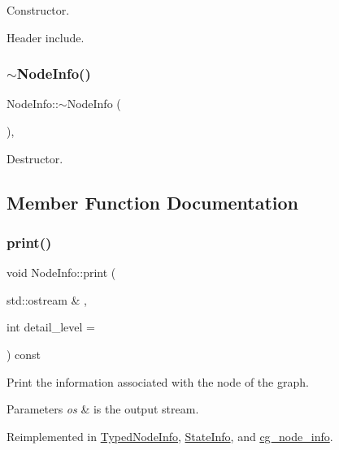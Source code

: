Constructor. 

Header include. \mbox{\label{structNodeInfo_a1543255862f1a3dbc456d1113c0c8f49}} 
\subsubsection{\texorpdfstring{$\sim$\+Node\+Info()}{~NodeInfo()}}
{\footnotesize\ttfamily Node\+Info\+::$\sim$\+Node\+Info (\begin{DoxyParamCaption}{ }\end{DoxyParamCaption})\hspace{0.3cm}{\ttfamily [virtual]}, {\ttfamily [default]}}



Destructor. 



\subsection{Member Function Documentation}
\mbox{\label{structNodeInfo_adacfeaff90018a35bde5211edbbd1114}} 
\subsubsection{\texorpdfstring{print()}{print()}}
{\footnotesize\ttfamily void Node\+Info\+::print (\begin{DoxyParamCaption}\item[{std\+::ostream \&}]{,  }\item[{int}]{detail\+\_\+level = {} }\end{DoxyParamCaption}) const\hspace{0.3cm}{\ttfamily [virtual]}}



Print the information associated with the node of the graph. 


\begin{DoxyParams}{Parameters}
{\em os} & is the output stream. \\
\hline
\end{DoxyParams}


Reimplemented in \hyperlink{structTypedNodeInfo_ad2e8b00442b9215ece3d7b2cf2495aef}{Typed\+Node\+Info}, \hyperlink{structStateInfo_af50fac3fb978c2de96361a42d8087962}{State\+Info}, and \hyperlink{structcg__node__info_a010ce271e49a819e639abc65ec0cbdcc}{cg\+\_\+node\+\_\+info}.



